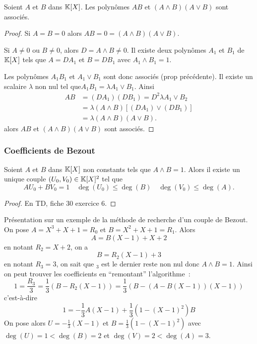 \begin{prop}
  Soient \(A\) et \(B\) dans \(\mathbb{K}[X]\). Les polynômes \(AB\) et \((A\wedge B)(A 
  \vee B)\) sont associés.
\end{prop}
\begin{proof}
  Si \(A=B=0\) alors \(AB=0=(A\wedge B)(A \vee B)\).

  Si \(A\neq 0\) ou \(B\neq 0\), alors \(D=A \wedge B \neq 0\). Il existe deux 
  polynômes \(A_1\) et \(B_1\) de \(\mathbb{K}[X]\) tels que \(A=DA_1\) et \(B=DB_1\) 
  avec \(A_1 \wedge B_1 =1\).

  Les polynômes \(A_1B_1\) et \(A_1 \vee B_1\) sont donc associés (prop 
  précédente). Il existe un scalaire \(\lambda\) non nul tel que\( A_1B_1= 
  \lambda A_1 \vee B_1\). Ainsi
  \begin{align}
    AB&=(DA_1)(DB_1) = D^2 \lambda A_1 \vee B_2 \\
    &=\lambda (A \wedge B) [(DA_1) \vee (DB_1)]\\
    &=\lambda (A \wedge B)(A \vee B).
  \end{align}
  alors \(AB\) et \((A\wedge B)(A \vee B)\) sont associés.
\end{proof}

\subsubsection{Coefficients de Bezout}

\begin{prop}
  Soient \(A\) et \(B\) dans \(\mathbb{K}[X]\) non constants tels que \(A\wedge B=1\). 
  Alors il existe un unique couple \((U_0,V_0) \in \mathbb{K}[X]^2\) tel que
  \begin{equation}
    AU_0+BV_0 = 1 \quad \deg(U_0) \leqslant \deg(B) \quad \deg(V_0) \leqslant 
    \deg(A).
  \end{equation}
\end{prop}
\begin{proof}
  En TD, fiche 30 exercice 6.
\end{proof}

Présentation sur un exemple de la méthode de recherche d'un couple de Bezout. On 
pose \(A=X^3+X+1=R_0\) et \(B=X^2+X+1=R_1\). Alors
\begin{equation}
  A=B(X-1)+X+2
\end{equation}
en notant \(R_2=X+2\), on a
\begin{equation}
  B=R_2(X-1)+3
\end{equation}
en notant \(R_3=3\), on sait que \(_3\) est le dernier reste non nul donc 
\(A\wedge B=1\). Ainsi on peut trouver les coefficients en ``remontant'' 
l'algorithme~:
\begin{equation}
  1 = \frac{R_3}{3} = \frac{1}{3}(B-R_2(X-1)) = \frac{1}{3}(B-(A-B(X-1))(X-1))
\end{equation}
c'est-à-dire
\begin{equation}
  1 = -\frac{1}{3} A(X-1) + \frac{1}{3}(1-(X-1)^2)B
\end{equation}
On pose alors \(U=-\frac{1}{3}(X-1)\) et \(B=\frac{1}{3}(1-(X-1)^2)\) avec 
\(\deg(U)=1 < \deg(B)=2\) et \(\deg(V)=2 < \deg(A)=3\).

